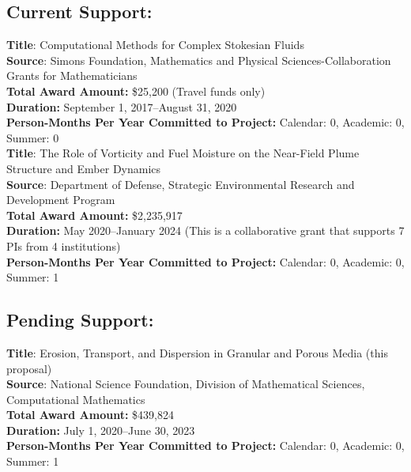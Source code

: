 \documentclass[11pt]{article}
\begin{document}
\subsection*{Current Support:}
{\bf Title}: Computational Methods for Complex Stokesian Fluids \\
{\bf Source}: Simons Foundation, Mathematics and Physical
Sciences-Collaboration Grants for Mathematicians \\
{\bf Total Award Amount:} \$25,200 (Travel funds only) \\
{\bf Duration:} September 1, 2017--August 31, 2020 \\
{\bf Person-Months Per Year Committed to Project:} Calendar: 0,
Academic: 0, Summer: 0 \\

\noindent
{\bf Title}: The Role of Vorticity and Fuel Moisture on the Near-Field
Plume Structure and Ember Dynamics \\
{\bf Source}: Department of Defense, Strategic Environmental Research
and Development Program \\
{\bf Total Award Amount:} \$2,235,917 \\
{\bf Duration:} May 2020--January 2024 (This is a collaborative grant
that supports 7 PIs from 4 institutions) \\
{\bf Person-Months Per Year Committed to Project:} Calendar: 0,
Academic: 0, Summer: 1 \\


\vspace{-17pt}
\subsection*{Pending Support:}
{\bf Title}: Erosion, Transport, and Dispersion in Granular and Porous
Media (this proposal) \\
{\bf Source}: National Science Foundation, Division of Mathematical
Sciences, Computational Mathematics \\
{\bf Total Award Amount:} \$439,824 \\
{\bf Duration:} July 1, 2020--June 30, 2023 \\
{\bf Person-Months Per Year Committed to Project:} Calendar: 0,
Academic: 0, Summer: 1 \\
\end{document}
